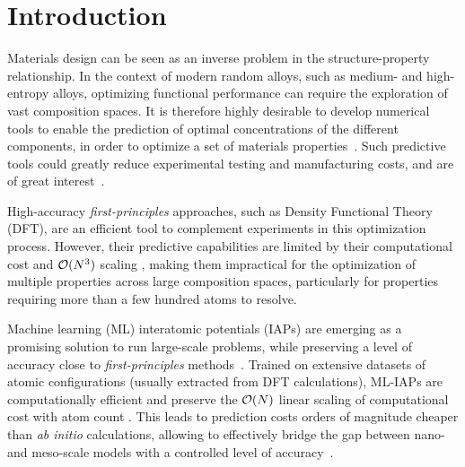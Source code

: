 \documentclass[%
 reprint,
aip,jcp
]{revtex4-1}
\newcommand\red[1]{\textcolor{red}{#1}}
\begin{document}
\maketitle



\section{Introduction}
\label{sec:Introduction}


Materials design can be seen as an inverse problem
in the structure-property relationship. 
In the context of modern random alloys, such as medium- and 
high-entropy alloys, optimizing functional performance
can require the exploration of vast 
composition spaces.
It is therefore highly desirable to develop numerical tools to
enable the prediction of optimal concentrations of the different 
components, in order to optimize a set of materials  
properties~\cite{gubaev2019accelerating,kostiuchenko2019impact}.
Such predictive tools could greatly reduce experimental testing and 
manufacturing costs, and are of great interest~\cite{wen2019machine}. 


High-accuracy \emph{first-principles} approaches, such as Density
Functional Theory (DFT), are an efficient tool to complement
experiments in this optimization process.
However, their predictive capabilities are limited by their 
computational cost and ${\cal O}(N^3)$ scaling
\cite{guerra1998towards}, making them impractical 
for the optimization of multiple properties across large composition 
spaces, particularly for properties requiring more than a few hundred 
atoms to resolve.


Machine learning (ML) interatomic potentials (IAPs) are emerging as a 
promising solution to run large-scale problems, while preserving a 
level of accuracy close to \emph{first-principles}
methods~\cite{bartok2010gaussian}.
Trained on extensive datasets of atomic configurations (usually
extracted from DFT calculations), ML-IAPs are computationally efficient 
and preserve the ${\cal O}(N)$ linear
scaling of computational cost with atom count \cite{zuo2020performance}.
This leads to prediction costs orders of magnitude cheaper than \emph{ab
initio} calculations, allowing to effectively bridge the gap between 
nano- and meso-scale models with a controlled level of 
accuracy~\cite{chen2017accurate,wood2019data}.
\end{document}
